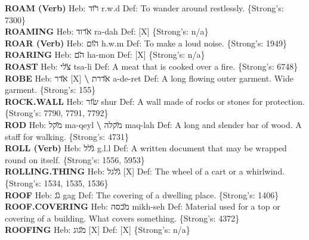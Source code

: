 {\textbf{ROAM (Verb)} Heb: {\large\H רוד} r.w.d Def: To wander around restlessly. \{Strong's: 7300\}\hfill{}\\

\textbf{ROAMING} Heb: {\large\H ארוד} ra-dah Def: {[}X{]} \{Strong's: n/a\}\hfill{}\\

\textbf{ROAR (Verb)} Heb: {\large\H הום} h.w.m Def: To make a loud noise. \{Strong's: 1949\}\hfill{}\\

\textbf{ROARING} Heb: {\large\H הם} ha-mon Def: {[}X{]} \{Strong's: n/a\}\hfill{}\\

\textbf{ROAST} Heb: {\large\H צלי} tsa-li Def: A meat that is cooked over a fire. \{Strong's: 6748\}\hfill{}\\

\textbf{ROBE} Heb: {\large\H אדר} {[}X{]} \textbf{\textbackslash{}} {\large\H אדרת} a-de-ret Def: A long flowing outer garment. Wide garment. \{Strong's: 155\}\hfill{}\\

\textbf{ROCK.WALL} Heb: {\large\H שור} shur Def: A wall made of rocks or stones for protection. \{Strong's: 7790, 7791, 7792\}\hfill{}\\

\textbf{ROD} Heb: {\large\H מקל} ma-qeyl \textbf{\textbackslash{}} {\large\H מקלה} maq-lah Def: A long and slender bar of wood. A staff for walking. \{Strong's: 4731\}\hfill{}\\

\textbf{ROLL (Verb)} Heb: {\large\H גלל} g.l.l Def: A written document that may be wrapped round on itself. \{Strong's: 1556, 5953\}\hfill{}\\

\textbf{ROLLING.THING} Heb: {\large\H גלגל} {[}X{]} Def: The wheel of a cart or a whirlwind. \{Strong's: 1534, 1535, 1536\}\hfill{}\\

\textbf{ROOF} Heb: {\large\H גג} gag Def: The covering of a dwelling place. \{Strong's: 1406\}\hfill{}\\

\textbf{ROOF.COVERING} Heb: {\large\H מכסה} mikh-seh Def: Material used for a top or covering of a building. What covers something. \{Strong's: 4372\}\hfill{}\\

\textbf{ROOFING} Heb: {\large\H מגוג} {[}X{]} Def: {[}X{]} \{Strong's: n/a\}\hfill{}\\

}
